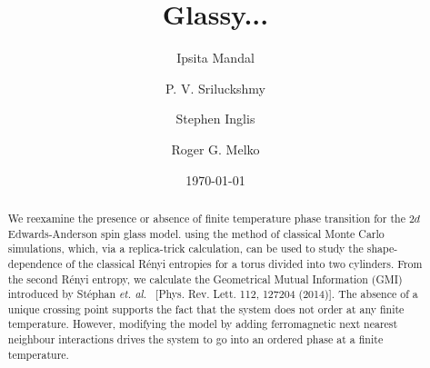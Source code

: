 \documentclass[a4paper,aps,prl,reprint,superscriptaddress,twocolumn,floatfix]{revtex4-1}
\begin{document}
\newcommand{\beq}{\begin{equation}}
\newcommand{\eeq}{\end{equation}}
\newcommand{\beqa}{\begin{eqnarray}}
\newcommand{\eeqa}{\end{eqnarray}}
\newcommand{\ben}{\begin{enumerate}}
\newcommand{\een}{\end{enumerate}}
\newcommand{\hs}{\hspace{0.5cm}}
\newcommand{\vs}{\vspace{0.5cm}}

\title{Glassy...}

\author{Ipsita Mandal}

\author{ P. V. Sriluckshmy}

\author{Stephen Inglis}


\author{Roger G. Melko}

\date{\today}

\begin{abstract}
We reexamine the presence or absence of finite temperature phase transition for the $2d$ Edwards-Anderson spin glass model.
using the method of classical Monte Carlo simulations, 
which, via a replica-trick calculation, can be used to study the shape-dependence of the classical R\'enyi entropies
for a torus divided into two cylinders.
From the second R\'enyi entropy, we calculate the Geometrical Mutual Information (GMI) introduced by St\'ephan {\it et. al.}~
[Phys. Rev. Lett. 112, 127204 (2014)]. The absence of a unique crossing point supports the fact that the system does not order at any finite temperature. However, modifying the model by adding  ferromagnetic next nearest neighbour interactions drives the system to go into an ordered phase at a finite temperature.
\end{abstract}

\maketitle
\end{document}
